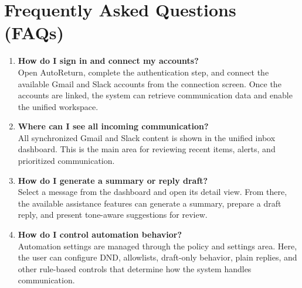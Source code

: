 \section{Frequently Asked Questions (FAQs)}
\begin{enumerate}
    \item \textbf{How do I sign in and connect my accounts?} \\
    Open AutoReturn, complete the authentication step, and connect the available Gmail and Slack accounts from the connection screen. Once the accounts are linked, the system can retrieve communication data and enable the unified workspace.

    \item \textbf{Where can I see all incoming communication?} \\
    All synchronized Gmail and Slack content is shown in the unified inbox dashboard. This is the main area for reviewing recent items, alerts, and prioritized communication.

    \item \textbf{How do I generate a summary or reply draft?} \\
    Select a message from the dashboard and open its detail view. From there, the available assistance features can generate a summary, prepare a draft reply, and present tone-aware suggestions for review.

    \item \textbf{How do I control automation behavior?} \\
    Automation settings are managed through the policy and settings area. Here, the user can configure DND, allowlists, draft-only behavior, plain replies, and other rule-based controls that determine how the system handles communication.
\end{enumerate}
